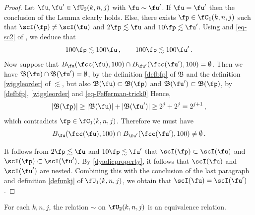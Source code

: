 \begin{proof}
    Let $\fu, \fu' \in \fU_2(k,n,j)$ with $\fu \sim \fu'$. If $\fu = \fu'$ then the conclusion of the Lemma clearly holds. Else, there exists $\fp \in \fC_1(k,n,j)$ such that $\scI(\fp) \ne \scI(\fu)$ and $2 \fp \lesssim \fu$ and $10 \fp \lesssim \fu'$.
    Using  and \eqref{eq-sc2} of , we deduce that
    \begin{equation}
        \label{eq-Fefferman-trick0}
        100 \fp\lesssim 100 \fu\,, \qquad 100 \fp \lesssim 100\fu'\,.
    \end{equation}
    Now suppose that $B_{\fu}(\fcc(\fu), 100) \cap B_{\fu'}(\fcc(\fu'), 100) = \emptyset$. Then we have $\mathfrak{B}(\fu) \cap \mathfrak{B}(\fu') = \emptyset$, by the definition \eqref{defbfp} of $\mathfrak{B}$ and the definition \eqref{wiggleorder} of $\lesssim$, but also $\mathfrak{B}(\fu) \subset \mathfrak{B}(\fp)$ and $\mathfrak{B}(\fu') \subset \mathfrak{B}(\fp)$, by \eqref{defbfp}, \eqref{wiggleorder} and \eqref{eq-Fefferman-trick0}
    Hence,
    $$
        |\mathfrak{B}(\fp)| \geq |\mathfrak{B}(\fu)| + |\mathfrak{B}(\fu')| \geq 2^{j} + 2^j = 2^{j+1}\,,
    $$
    which contradicts $\fp \in \fC_1(k,n,j)$. Therefore we must have
    \begin{equation*}
        B_{\fu}(\fcc(\fu), 100) \cap B_{\fu'}(\fcc(\fu'), 100) \ne \emptyset\, .
    \end{equation*}

    It follows from $2\fp \lesssim \fu$ and $10\fp \lesssim \fu'$ that $\scI(\fp) \subset \scI(\fu)$ and $\scI(\fp) \subset \scI(\fu')$. By \eqref{dyadicproperty}, it follows that $\scI(\fu)$ and $\scI(\fu')$ are nested.
    Combining this with the conclusion of the last paragraph and definition \eqref{defunkj} of $\fU_1(k,n,j)$, we obtain that $\scI(\fu) = \scI(\fu')$.
\end{proof}


\begin{lemma}
\label{equivalence-relation}
\leanok
{}
For each $k,n,j$, the relation $\sim$ on
$\fU_2(k,n,j)$ is an equivalence relation.
\end{lemma}

